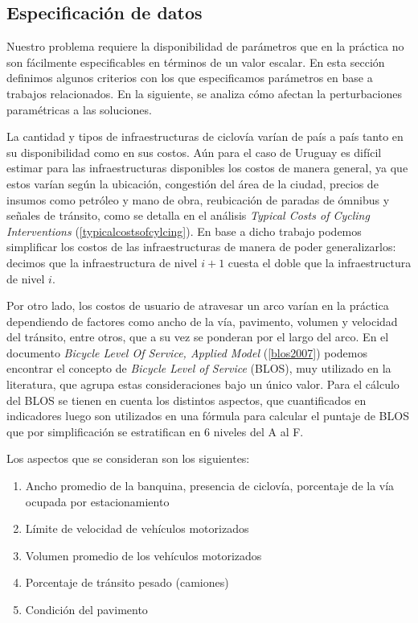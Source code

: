 \documentclass{article}
\begin{document}
  \subsection{Especificación de datos}

  Nuestro problema requiere la disponibilidad de parámetros que en la práctica no son fácilmente especificables en términos de un valor escalar. En esta sección definimos algunos criterios con los que especificamos parámetros en base a trabajos relacionados. En la siguiente, se analiza cómo afectan la perturbaciones paramétricas a las soluciones.

  La cantidad y tipos de infraestructuras de ciclovía varían de país a país tanto en su disponibilidad como en sus costos. Aún para el caso de Uruguay es difícil estimar para las infraestructuras disponibles los costos de manera general, ya que estos varían según la ubicación, congestión del área de la ciudad, precios de insumos como petróleo y mano de obra, reubicación de paradas de ómnibus y señales de tránsito, como se detalla en el análisis {\it Typical Costs of Cycling Interventions} (\ref{typicalcostsofcylcing}). En base a dicho trabajo podemos simplificar los costos de las infraestructuras de manera de poder generalizarlos: decimos que la infraestructura de nivel $i+1$ cuesta el doble que la infraestructura de nivel $i$.

  Por otro lado, los costos de usuario de atravesar un arco varían en la práctica dependiendo de factores como ancho de la vía, pavimento, volumen y velocidad del tránsito, entre otros, que a su vez se ponderan por el largo del arco. En el documento {\it Bicycle Level Of Service, Applied Model} (\ref{blos2007}) podemos encontrar el concepto de {\it Bicycle Level of Service} (BLOS), muy utilizado en la literatura, que agrupa estas consideraciones bajo un único valor. Para el cálculo del BLOS se tienen en cuenta los distintos aspectos, que cuantificados en indicadores luego son utilizados en una fórmula para calcular el puntaje de BLOS que por simplificación se estratifican en 6 niveles del A al F.

  Los aspectos que se consideran son los siguientes:

  \begin{enumerate}
    \item{Ancho promedio de la banquina, presencia de ciclovía, porcentaje de la vía ocupada por estacionamiento}
    \item{Límite de velocidad de vehículos motorizados}
    \item{Volumen promedio de los vehículos motorizados}
    \item{Porcentaje de tránsito pesado (camiones)}
    \item{Condición del pavimento}
  \end{enumerate}
\end{document}
